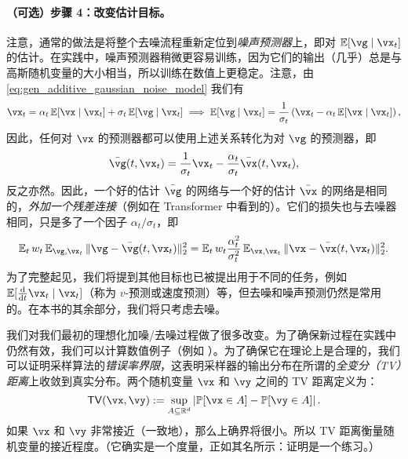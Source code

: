 \documentclass[../../book-main.tex]{subfiles}
\begin{document}
\paragraph{（可选）步骤 4：改变估计目标。} 注意，通常的做法是将整个去噪流程重新定位到\textit{噪声预测器}上，即对 \(\Ex[\vg \mid \vx_{t}]\) 的估计。在实践中，噪声预测器稍微更容易训练，因为它们的输出（几乎）总是与高斯随机变量的大小相当，所以训练在数值上更稳定。注意，由 \eqref{eq:gen_additive_gaussian_noise_model} 我们有
\begin{equation}
	\vx_{t} = \alpha_{t}\Ex[\vx \mid \vx_{t}] + \sigma_{t}\Ex[\vg \mid \vx_{t}] \implies \Ex[\vg \mid \vx_{t}] = \frac{1}{\sigma_{t}}\bp{\vx_{t} - \alpha_{t}\Ex[\vx \mid \vx_{t}]},
\end{equation}
因此，任何对 \(\vx\) 的预测器都可以使用上述关系转化为对 \(\vg\) 的预测器，即
\begin{equation}
	\bar{\vg}(t, \vx_{t}) = \frac{1}{\sigma_{t}}\vx_{t} - \frac{\alpha_{t}}{\sigma_{t}}\bar{\vx}(t, \vx_{t}),
\end{equation}
反之亦然。因此，一个好的估计 \(\bar{\vg}\) 的网络与一个好的估计 \(\bar{\vx}\) 的网络是相同的，\textit{外加一个残差连接}（例如在 Transformer 中看到的）。它们的损失也与去噪器相同，只是多了一个因子 \(\alpha_{t}/\sigma_{t}\)，即
\begin{equation}
	\Ex_{t}w_{t}\Ex_{\vg, \vx_{t}}\norm{\vg - \bar{\vg}(t, \vx_{t})}_{2}^{2} = \Ex_{t}w_{t}\frac{\alpha_{t}^{2}}{\sigma_{t}^{2}}\Ex_{\vx, \vx_{t}}\norm{\vx - \bar{\vx}(t, \vx_{t})}_{2}^{2}.
\end{equation}
为了完整起见，我们将提到其他目标也已被提出用于不同的任务，例如 \(\Ex[\odv*{\vx_{t}}{t} \mid \vx_{t}]\)（称为 \(v\)-预测或速度预测）等，但去噪和噪声预测仍然是常用的。在本书的其余部分，我们将只考虑去噪。


我们对我们最初的理想化加噪/去噪过程做了很多改变。为了确保新过程在实践中仍然有效，我们可以计算数值例子（例如 ）。为了确保它在理论上是合理的，我们可以证明采样算法的\textit{错误率界限}，这表明采样器的输出分布在所谓的\textit{全变分（TV）距离}上收敛到真实分布。两个随机变量 \(\vx\) 和 \(\vy\) 之间的 TV 距离定义为：
\begin{equation}
	\TV(\vx, \vy) := \sup_{A \subseteq \R^{d}}\abs*{\Pr[\vx \in A] - \Pr[\vy \in A]}.
\end{equation}
如果 \(\vx\) 和 \(\vy\) 非常接近（一致地），那么上确界将很小。所以 TV 距离衡量随机变量的接近程度。（它确实是一个度量，正如其名所示：证明是一个练习。）
\end{document}
